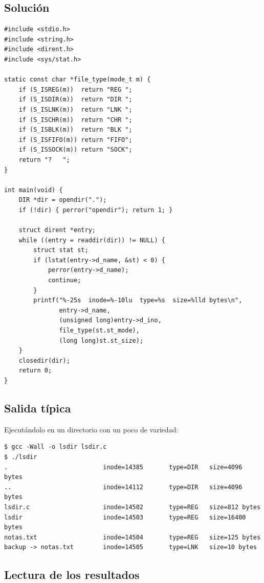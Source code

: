 \documentclass[11pt,a4paper]{article}
\begin{document}
\subsection*{Solución}

\begin{lstlisting}[style=cstyle]
#include <stdio.h>
#include <string.h>
#include <dirent.h>
#include <sys/stat.h>

static const char *file_type(mode_t m) {
    if (S_ISREG(m))  return "REG ";
    if (S_ISDIR(m))  return "DIR ";
    if (S_ISLNK(m))  return "LNK ";
    if (S_ISCHR(m))  return "CHR ";
    if (S_ISBLK(m))  return "BLK ";
    if (S_ISFIFO(m)) return "FIFO";
    if (S_ISSOCK(m)) return "SOCK";
    return "?   ";
}

int main(void) {
    DIR *dir = opendir(".");
    if (!dir) { perror("opendir"); return 1; }

    struct dirent *entry;
    while ((entry = readdir(dir)) != NULL) {
        struct stat st;
        if (lstat(entry->d_name, &st) < 0) {
            perror(entry->d_name);
            continue;
        }
        printf("%-25s  inode=%-10lu  type=%s  size=%lld bytes\n",
               entry->d_name,
               (unsigned long)entry->d_ino,
               file_type(st.st_mode),
               (long long)st.st_size);
    }
    closedir(dir);
    return 0;
}
\end{lstlisting}

\subsection*{Salida típica}

Ejecutándolo en un directorio con un poco de variedad:

\begin{lstlisting}[style=textstyle]
$ gcc -Wall -o lsdir lsdir.c
$ ./lsdir
.                          inode=14385       type=DIR   size=4096 bytes
..                         inode=14112       type=DIR   size=4096 bytes
lsdir.c                    inode=14502       type=REG   size=812 bytes
lsdir                      inode=14503       type=REG   size=16400 bytes
notas.txt                  inode=14504       type=REG   size=125 bytes
backup -> notas.txt        inode=14505       type=LNK   size=10 bytes
\end{lstlisting}

\subsection*{Lectura de los resultados}
\end{document}
